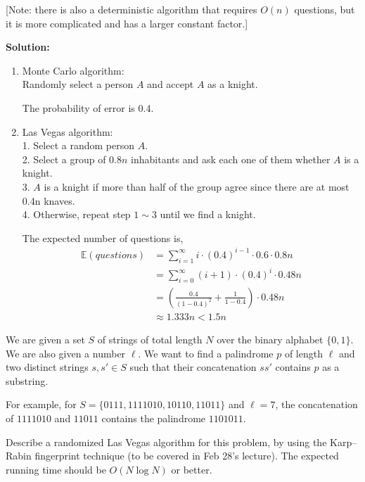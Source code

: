 \documentclass[11pt]{article}
\begin{document}
\begin{description}
\begin{enumerate}

[Note: there is also a deterministic algorithm that requires 
$O(n)$ questions, but it is more complicated and has a larger constant factor.]
\end{enumerate}

\textbf{Solution:}
\begin{enumerate}
  \item[(a)] Monte Carlo algorithm: \\
  Randomly select a person $A$ and accept $A$ as a knight.

  The probability of error is 0.4.

  \item[(b)] Las Vegas algorithm: \\
  1. Select a random person $A$. \\
  2. Select a group of $0.8n$ inhabitants and ask each one of them whether
  $A$ is a knight. \\
  3. $A$ is a knight if more than half of the group agree since there are
  at most 0.4n knaves. \\
  4. Otherwise, repeat step $1\sim3$ until we find a knight.

  The expected number of questions is,
  \begin{align*}
  \mathbb{E}(questions) 
  &= \sum_{i=1}^{\infty} i\cdot(0.4)^{i-1}\cdot0.6\cdot0.8n \\
  &= \sum_{i=0}^{\infty} (i+1)\cdot(0.4)^i\cdot0.48n \\
  &= \left(\frac{0.4}{(1-0.4)^2} + \frac{1}{1-0.4}\right) \cdot 0.48n \\
  &\approx 1.333n < 1.5n
  \end{align*}
\end{enumerate}


\newpage
\item[Problem 4.3:]
We are given a set $S$ of strings of total length $N$ over the binary alphabet $\{0,1\}$.
We are also given a number $\ell$. 
We want to find a palindrome $p$ of length $\ell$ and two distinct strings $s,s'\in S$ such that
their concatenation $ss'$ contains $p$ as a substring.

For example, for $S=\{0111,1111010,10110,11011\}$ and $\ell=7$, 
the concatenation of $1111010$ and $11011$ contains the palindrome $1101011$.

Describe a randomized Las Vegas algorithm for this problem, by using the Karp--Rabin fingerprint technique (to be covered in Feb 28's lecture).  The expected running time should be $O(N\log N)$ or better.


\end{description}
\end{document}
